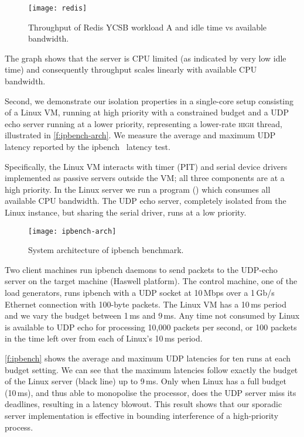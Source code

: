 \begin{figure}[b]
  \centering
  \texttt{[image: redis]}
  \caption{Throughput of Redis YCSB workload A and idle time vs available bandwidth.}
  \label{f:redis}
\end{figure}

The graph shows that the server is CPU limited (as indicated by very low idle time)
and consequently throughput scales linearly with available CPU
bandwidth.

Second, we demonstrate our isolation properties
in a single-core setup consisting of a Linux VM,
running at high priority with a
constrained budget and a UDP echo server running at a lower priority,
representing a lower-rate \textsc{high} thread, illustrated in \autoref{f:ipbench-arch}. We
measure the average  and maximum UDP latency reported by the
ipbench~\citep{Wienand_Macpherson_04} latency test.

Specifically, the Linux VM interacts with timer (PIT) and serial device drivers implemented as
passive servers outside the VM; all three components are at a high priority. In the Linux server we
run a program () which consumes all available
CPU bandwidth.  The UDP echo server, completely isolated from the Linux instance, but sharing the serial driver,
runs at a low priority.

\begin{figure}[t]
    \centering
    \texttt{[image: ipbench-arch]}
    \caption{System architecture of ipbench benchmark.}
    \label{f:ipbench-arch}
\end{figure}

Two client machines run ipbench daemons to send packets to the UDP-echo server on the target machine
(Haswell platform). The control machine, one of the load generators, runs ipbench with a \gls{UDP} socket at 10\,Mbps over a 1\,Gb/s Ethernet connection with 100-byte packets. The Linux VM has a 10\,ms period and we vary the
budget between 1\,ms and 9\,ms.
Any time not consumed by Linux is available to UDP echo for processing
10,000 packets per second, or 100 packets in the time left over from
each of Linux's 10\,ms period.

\autoref{f:ipbench} shows the average and maximum UDP latencies for
ten runs at each budget setting. We can see that the maximum latencies
follow exactly the budget of the Linux server (black line) up to 9\,ms. Only
when Linux has a full budget (10\,ms), and thus able to monopolise the
processor, does the UDP server miss its deadlines, resulting in a
latency blowout.  This result shows that our sporadic server implementation is effective in bounding interference of a high-priority process.

